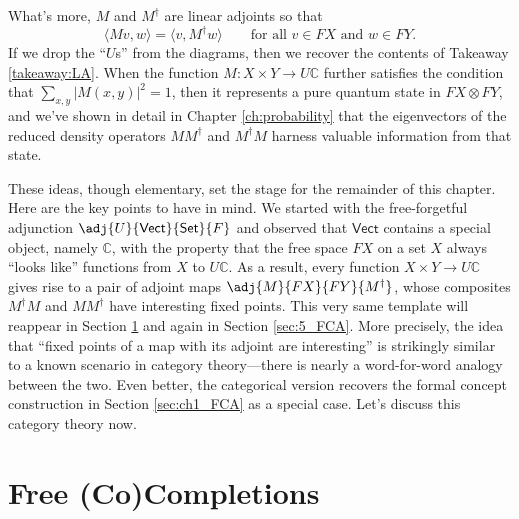 What's more, $M$ and $M^\dagger$ are linear adjoints so that
\begin{equation}\label{eq5:adjoint}
\langle Mv,w\rangle = \langle v,M^\dagger w\rangle \qquad \text{for all $v\in FX$ and $w\in FY$.}
\end{equation}
If we drop the ``$U$s'' from the diagrams, then we recover the contents of Takeaway \ref{takeaway:LA}. When the function $M\colon X\times Y\to U\mathbb{C}$ further satisfies the condition that $\sum_{x,y}|M(x,y)|^2=1$, then it represents a pure quantum state in $FX\otimes FY$, and we've shown in detail in Chapter \ref{ch:probability} that the eigenvectors of the reduced density operators $MM^\dagger $ and $M^\dagger M$ harness valuable information from that state.  

These ideas, though elementary, set the stage for the remainder of this chapter. Here are the key points to have in mind. We started with the free-forgetful adjunction $\adj{U}{\mathsf{Vect}}{\mathsf{Set}}{F}$ and observed that $\mathsf{Vect}$ contains a special object, namely $\mathbb{C}$, with the property that the free space $FX$ on a set $X$ always ``looks like'' functions from $X$ to $U\mathbb{C}$. As a result, every  function $X\times Y\to U\mathbb{C}$ gives rise to a pair of adjoint maps $\adj{M}{FX}{FY}{M^\dagger}$, whose composites $M^\dagger M$ and $MM^\dagger$ have interesting fixed points. This very same template will reappear in Section \ref{sec:5_CT} and again in Section \ref{sec:5_FCA}. More precisely, the idea that ``fixed points of a map with its adjoint are interesting'' is strikingly similar to a known scenario in category theory---there is nearly a word-for-word analogy between the two.  Even better, the categorical version recovers the formal concept construction in Section \ref{sec:ch1_FCA} as a special case. Let's discuss this category theory now.


\section{Free (Co)Completions}\label{sec:5_CT}

